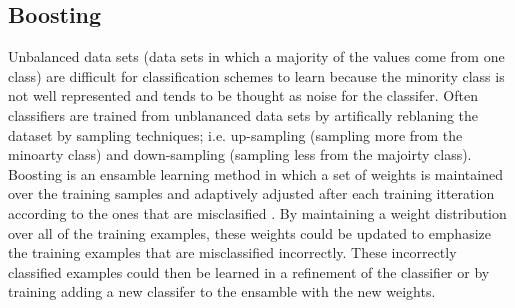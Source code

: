 \subsection{Boosting}
Unbalanced data sets (data sets in which a majority of the values come from one class) are difficult for classification schemes to learn because the minority class is not well represented and tends to be thought as noise for the classifer.
Often classifiers are trained from unblananced data sets by artifically reblaning the dataset by sampling techniques; i.e. up-sampling (sampling more from the minoarty class) and down-sampling (sampling less from the majoirty class).
Boosting is an ensamble learning method in which a set of weights is maintained over the training samples and adaptively adjusted after each training itteration according to the ones that are misclasified \cite{LICITATION}.
By maintaining a weight distribution over all of the training examples, these weights could be updated to emphasize the training examples that are misclassified incorrectly.  These incorrectly classified examples could then be learned in a refinement of the classifier or by training adding a new classifer to the ensamble with the new weights.

